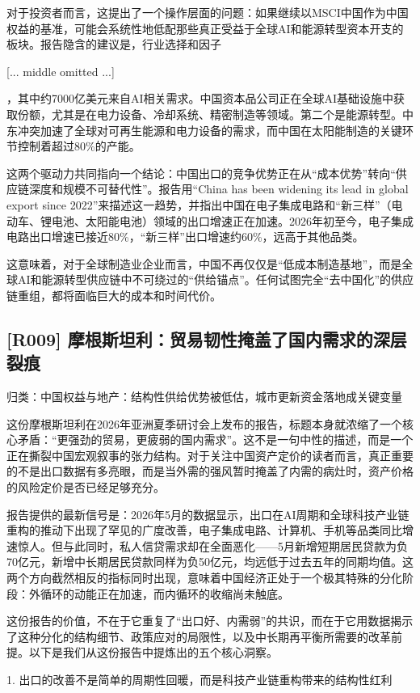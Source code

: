 \documentclass[11pt]{ctexart}
\begin{document}
对于投资者而言，这提出了一个操作层面的问题：如果继续以MSCI中国作为中国权益的基准，可能会系统性地低配那些真正受益于全球AI和能源转型资本开支的板块。报告隐含的建议是，行业选择和因子

[... middle omitted ...]

，其中约7000亿美元来自AI相关需求。中国资本品公司正在全球AI基础设施中获取份额，尤其是在电力设备、冷却系统、精密制造等领域。第二个是能源转型。中东冲突加速了全球对可再生能源和电力设备的需求，而中国在太阳能制造的关键环节控制着超过80\%的产能。

这两个驱动力共同指向一个结论：中国出口的竞争优势正在从“成本优势”转向“供应链深度和规模不可替代性”。报告用“China has been widening its lead in global export since 2022”来描述这一趋势，并指出中国在电子集成电路和“新三样”（电动车、锂电池、太阳能电池）领域的出口增速正在加速。2026年初至今，电子集成电路出口增速已接近80\%，“新三样”出口增速约60\%，远高于其他品类。

这意味着，对于全球制造业企业而言，中国不再仅仅是“低成本制造基地”，而是全球AI和能源转型供应链中不可绕过的“供给锚点”。任何试图完全“去中国化”的供应链重组，都将面临巨大的成本和时间代价。

\subsection{[R009] 摩根斯坦利：贸易韧性掩盖了国内需求的深层裂痕}
{\small\color{refgray}归类：中国权益与地产：结构性供给优势被低估，城市更新资金落地成关键变量}

这份摩根斯坦利在2026年亚洲夏季研讨会上发布的报告，标题本身就浓缩了一个核心矛盾：“更强劲的贸易，更疲弱的国内需求”。这不是一句中性的描述，而是一个正在撕裂中国宏观叙事的张力结构。对于关注中国资产定价的读者而言，真正重要的不是出口数据有多亮眼，而是当外需的强风暂时掩盖了内需的病灶时，资产价格的风险定价是否已经足够充分。

报告提供的最新信号是：2026年5月的数据显示，出口在AI周期和全球科技产业链重构的推动下出现了罕见的广度改善，电子集成电路、计算机、手机等品类同比增速惊人。但与此同时，私人信贷需求却在全面恶化——5月新增短期居民贷款为负70亿元，新增中长期居民贷款同样为负50亿元，均远低于过去五年的同期均值。这两个方向截然相反的指标同时出现，意味着中国经济正处于一个极其特殊的分化阶段：外循环的动能正在加速，而内循环的收缩尚未触底。

这份报告的价值，不在于它重复了“出口好、内需弱”的共识，而在于它用数据揭示了这种分化的结构细节、政策应对的局限性，以及中长期再平衡所需要的改革前提。以下是我们从这份报告中提炼出的五个核心洞察。

1. 出口的改善不是简单的周期性回暖，而是科技产业链重构带来的结构性红利
\end{document}
